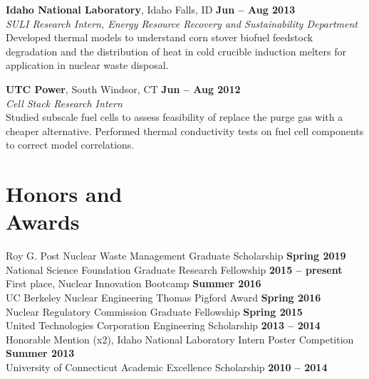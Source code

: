 \documentclass[margin,line]{resume}
\begin{document}
\begin{resume}
\textbf{Idaho National Laboratory}, Idaho Falls, ID \hfill 
    \textbf{Jun -- Aug 2013} \\
\textsl{SULI Research Intern, Energy Resource Recovery and Sustainability Department} \\
Developed thermal models to understand corn stover biofuel feedstock degradation and the distribution of heat in cold crucible induction melters for application in nuclear waste disposal.

\textbf{UTC Power}, South Windsor, CT \hfill 
    \textbf{Jun -- Aug 2012} \\
\textsl{Cell Stack Research Intern} \\
Studied subscale fuel cells to assess feasibility of replace the purge gas with a cheaper alternative. Performed thermal conductivity tests on fuel cell components to correct model correlations.\\


\section{\mysidestyle Honors and\\Awards}
Roy G. Post Nuclear Waste Management Graduate Scholarship \hfill \textbf{Spring 2019}\vspace{.5mm} \\
National Science Foundation Graduate Research Fellowship \hfill \textbf{2015 -- present}\vspace{.5mm} \\
First place, Nuclear Innovation Bootcamp \hfill \textbf{Summer 2016}\vspace{.5mm} \\
UC Berkeley Nuclear Engineering Thomas Pigford Award \hfill \textbf{Spring 2016}\vspace{.5mm} \\	
Nuclear Regulatory Commission Graduate Fellowship \hfill \textbf{Spring 2015}\vspace{.5mm} \\
United Technologies Corporation Engineering Scholarship \hfill \textbf{2013 -- 2014}\vspace{.5mm} \\
Honorable Mention (x2), Idaho National Laboratory Intern Poster Competition \hfill \textbf{Summer 2013}\vspace{.5mm} \\
University of Connecticut Academic Excellence Scholarship \hfill \textbf{2010 -- 2014} \\


\end{resume}
\end{document}
